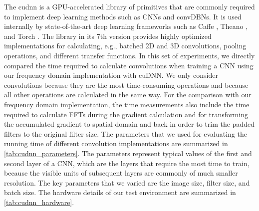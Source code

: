 The \gls{cudnn} \citep{chetlur2014} is a GPU-accelerated library of primitives
that are commonly required to implement deep learning methods such as CNNs and
convDBNs. It is used internally by state-of-the-art deep learning frameworks
such as Caffe \citep{jia2014}, Theano \citep{bastien2012}, and Torch
\citep{collobert2011torch7}. The library in its 7th version provides highly
optimized implementations for calculating, e.g., batched 2D and 3D convolutions,
pooling operations, and different transfer functions. In this set of
experiments, we directly compared the time required to calculate convolutions
when training a CNN using our frequency domain implementation with cuDNN. We
only consider convolutions because they are the most time-consuming operations
and because all other operations are calculated in the same way. For the
comparison with our frequency domain implementation, the time measurements also
include the time required to calculate FFTs during the gradient calculation and
for transforming the accumulated gradient to spatial domain and back in order to
trim the padded filters to the original filter size. The parameters that we used
for evaluating the running time of different convolution implementations are
summarized in \ref{tab:cudnn_parameters}. The parameters represent typical
values of the first and second layer of a CNN, which are the layers that require
the most time to train, because the visible units of subsequent layers are
commonly of much smaller resolution. The key parameters that we varied are the
image size, filter size, and batch size. The hardware details of our test
environment are summarized in \ref{tab:cudnn_hardware}.



